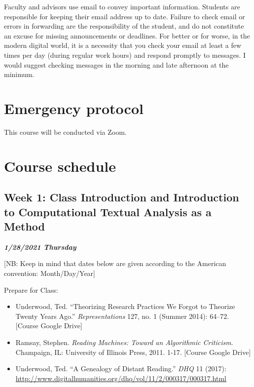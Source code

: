 \documentclass[
]{book}
\providecommand{\tightlist}{%
  \setlength{\itemsep}{0pt}\setlength{\parskip}{0pt}}
\begin{document}
Faculty and advisors use email to convey important information. Students are responsible for keeping their email address up to date. Failure to check email or errors in forwarding are the responsibility of the student, and do not constitute an excuse for missing announcements or deadlines. For better or for worse, in the modern digital world, it is a necessity that you check your email at least a few times per day (during regular work hours) and respond promptly to messages. I would suggest checking messages in the morning and late afternoon at the minimum.

\hypertarget{emergency-protocol}{%
\section{Emergency protocol}\label{emergency-protocol}}

This course will be conducted via Zoom.

\hypertarget{course-schedule}{%
\section{Course schedule}\label{course-schedule}}

\hypertarget{week-1-class-introduction-and-introduction-to-computational-textual-analysis-as-a-method}{%
\subsection{Week 1: Class Introduction and Introduction to Computational Textual Analysis as a Method}\label{week-1-class-introduction-and-introduction-to-computational-textual-analysis-as-a-method}}

\textbf{\emph{1/28/2021 Thursday}}

{[}NB: Keep in mind that dates below are given according to the American convention: Month/Day/Year{]}

Prepare for Class:

\begin{itemize}
\tightlist
\item
  Underwood, Ted. ``Theorizing Research Practices We Forgot to Theorize Twenty Years Ago.'' \emph{Representations} 127, no. 1 (Summer 2014): 64--72. {[}Course Google Drive{]}
\item
  Ramsay, Stephen. \emph{Reading Machines: Toward an Algorithmic Criticism}. Champaign, IL: University of Illinois Press, 2011. 1-17. {[}Course Google Drive{]}
\item
  Underwood, Ted. ``A Genealogy of Distant Reading.'' \emph{DHQ} 11 (2017): \url{http://www.digitalhumanities.org/dhq/vol/11/2/000317/000317.html}
\end{itemize}
\end{document}
